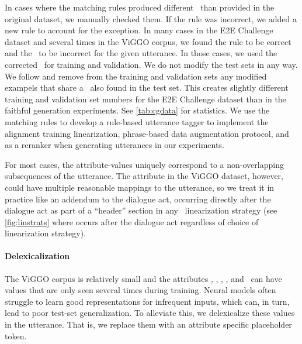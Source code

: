 

In cases where the matching rules produced different \meaningrepresentations~than provided in the
original dataset, we manually checked them. If the rule was incorrect,
we added a new rule to account for the exception. 
In many cases in the E2E Challenge
dataset
and several times in the ViGGO corpus, we found the rule to be correct and the \meaningrepresentation~to be
incorrect for the given utterance. In those cases, we used the corrected \meaningrepresentations~for
training and validation. %
We
do not modify the test sets in any way. We follow \citet{dusek2019} and remove from the training and validation
sets any modified exampels that share a \meaningrepresentation~also
found in the test set. This creates slightly different training and validation
set numbers for the E2E Challenge
dataset than in the faithful generation experiments. See \autoref{tab:cgdata} for 
statistics.
We use the matching rules to develop  a rule-based utterance 
tagger to implement the alignment training linearization, phrase-based data augmentation
protocol, and as a reranker when generating utterances in our experiments.





For most cases, the attribute-values uniquely correspond to a non-overlapping
subsequences of the utterance. The  attribute in the ViGGO dataset,
however, could have multiple reasonable mappings to the utterance, so we treat
it in practice like an addendum to the dialogue act, occurring directly after the
dialogue act as part of a ``header'' section in any \meaningrepresentation~linearization strategy
(see \autoref{fig:linstrats} where  occurs after the dialogue
act regardless of choice of linearization strategy).

\paragraph{Delexicalization} The ViGGO corpus is relatively small and the
attributes , , ,
, and ~can have values that are
only seen several times during training. Neural models often struggle to learn
good representations for infrequent inputs, which can, in turn, lead to poor
test-set generalization. To alleviate this, we delexicalize these values in
the utterance. That is, we replace them with an attribute specific placeholder
token.

